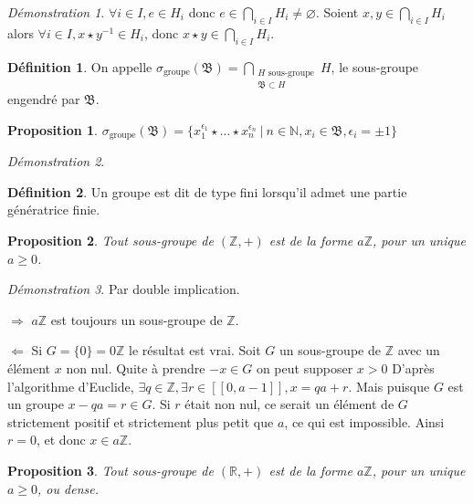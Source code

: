 \documentclass[a4paper, 11pt, french]{book}
\newenvironment{itemise}{\itemize}{\enditemize}
\let\colour=\color
\theoremstyle{plain} %
\newtheorem{proposition}{Proposition}
\theoremstyle{definition} %
\newtheorem{definition}{Définition}
\theoremstyle{remark} %
\newtheorem*{demonstration}{Démonstration}
\newcommand{\1}{\mathds{1}}
\newcommand\vide{\varnothing}
\newcommand{\inv}[1]{#1^{-1}}
\newcommand{\N}{\mathbb{N}}
\newcommand{\Z}{\mathbb{Z}}
\newcommand{\R}{\mathbb{R}}
\renewcommand{\frak}[1]{\mathfrak{#1}}
\newcommand\ens[2]{\{#1 \ |\ #2\}}
\newcommand\equivalence[3]{
	\begin{demonstration}
		#1
		\begin{itemise}
			\item[$\Longrightarrow$] #2
			\item[$\Longleftarrow$] #3
		\end{itemise}
	\end{demonstration}
}
\begin{document}
\begin{demonstration}
	$\forall i\in I, e\in H_i$ donc $e\in\bigcap_{i\in I}H_i\neq\vide$.
	Soient $x, y\in\bigcap_{i\in I}H_i$ alors $\forall i\in I, x\star\inv{y}\in H_i$, donc $x\star y\in\bigcap_{i\in I}H_i$.
\end{demonstration}

\begin{definition}
	On appelle $\sigma_\text{groupe}(\frak{B})=\bigcap_{\substack{H\text{ sous-groupe}\\\frak{B}\subset H}}H$, le sous-groupe engendré par $\frak{B}$.
\end{definition}

\begin{proposition}
	$\sigma_\text{groupe}(\frak{B})=\ens{x_1^{\epsilon_1}\star\dots\star x_n^{\epsilon_n}}{n\in\N, x_i\in\frak{B}, \epsilon_i=\pm1}$
\end{proposition}

\begin{demonstration}
	\colour{red}{À démontrer}
\end{demonstration}

\begin{definition}
	Un groupe est dit de type fini lorsqu'il admet une partie génératrice finie.
\end{definition}

\begin{proposition}
	Tout sous-groupe de $(\Z, +)$ est de la forme $a\Z$, pour un unique $a\geqslant0$.
\end{proposition}

\equivalence{Par double implication.}{
	$a\Z$ est toujours un sous-groupe de $\Z$.
}{
	Si $G=\{0\}=0\Z$ le résultat est vrai.
	Soit $G$ un sous-groupe de $\Z$ avec un élément $x$ non nul.
	Quite à prendre $-x\in G$ on peut supposer $x>0$
	D'après l'algorithme d'Euclide, $\exists q\in\Z, \exists r\in[\![0, a-1]\!], x = qa + r$.
	Mais puisque $G$ est un groupe $x-qa=r\in G$.
	Si $r$ était non nul, ce serait un élément de $G$ strictement positif et strictement plus petit que $a$, ce qui est impossible.
	Ainsi $r=0$, et donc $x\in a\Z$.
}

\begin{proposition}
	Tout sous-groupe de $(\R, +)$ est de la forme $a\Z$, pour un unique $a\geqslant0$, ou dense.
\end{proposition}
\end{document}
